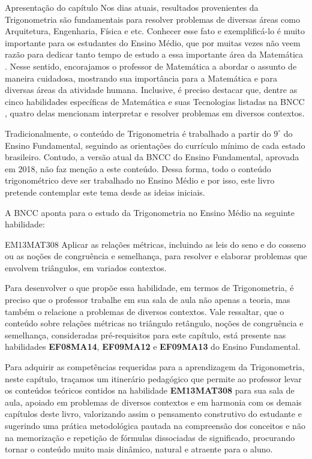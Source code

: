 \begin{apresentacao}{Apresentação do capítulo}
Nos dias atuais, resultados provenientes da Trigonometria são fundamentais para resolver problemas de diversas áreas como Arquitetura, Engenharia, Física e etc. 
%
Conhecer esse fato e exemplificá-lo é muito importante para os estudantes do Ensino Médio, que por muitas vezes não veem razão para dedicar tanto tempo de estudo a essa importante área da Matemática \citep{gur2009}. 
%
Nesse sentido, encorajamos o professor de Matemática a abordar o assunto de maneira cuidadosa, mostrando sua importância para a Matemática e para diversas áreas da atividade humana. 
%
Inclusive, é preciso destacar que, dentre as cinco habilidades específicas de Matemática e suas Tecnologias listadas na BNCC \citep{BNCC2018}, quatro delas mencionam interpretar e resolver problemas em diversos contextos.

Tradicionalmente, o conteúdo de Trigonometria é trabalhado a partir do $9^\circ$ do Ensino Fundamental, seguindo as orientações do currículo mínimo de cada estado brasileiro. 
%
Contudo, a versão atual da BNCC \citep{BNCC2018} do Ensino Fundamental, aprovada em 2018, não faz menção a este conteúdo.
%
Dessa forma, todo o conteúdo trigonométrico deve ser trabalhado no Ensino Médio e por isso, este livro pretende contemplar este tema desde as ideias iniciais.

A BNCC aponta para o estudo da Trigonometria no Ensino Médio na seguinte habilidade:

\begin{habilities}{EM13MAT308} 
Aplicar as relações métricas, incluindo as leis do seno e do cosseno ou as noções de congruência e semelhança, para resolver e elaborar problemas que envolvem triângulos, em variados contextos.
\end{habilities}

Para desenvolver o que propõe essa habilidade, em termos de Trigonometria, é preciso que o professor trabalhe em sua sala de aula não apenas a teoria, mas também o relacione a problemas de diversos contextos.
%
Vale ressaltar, que o conteúdo sobre relações métricas no triângulo retângulo, noções de congruência e semelhança, consideradas pré-requisitos para este capítulo, está presente nas habilidades \textbf{EF08MA14}, \textbf{EF09MA12} e \textbf{EF09MA13} do Ensino Fundamental.

Para adquirir as competências requeridas para a aprendizagem da Trigonometria, neste capítulo, traçamos um itinerário pedagógico que permite ao professor levar os conteúdos teóricos contidos na habilidade \textbf{EM13MAT308} para sua sala de aula, apoiado em problemas de diversos contextos e em harmonia com os demais capítulos deste livro, valorizando assim o pensamento construtivo do estudante e sugerindo uma prática metodológica pautada na compreensão dos conceitos e não na memorização e repetição de fórmulas dissociadas de significado, procurando tornar o conteúdo muito mais dinâmico, natural e atraente para o aluno.


\end{apresentacao}
